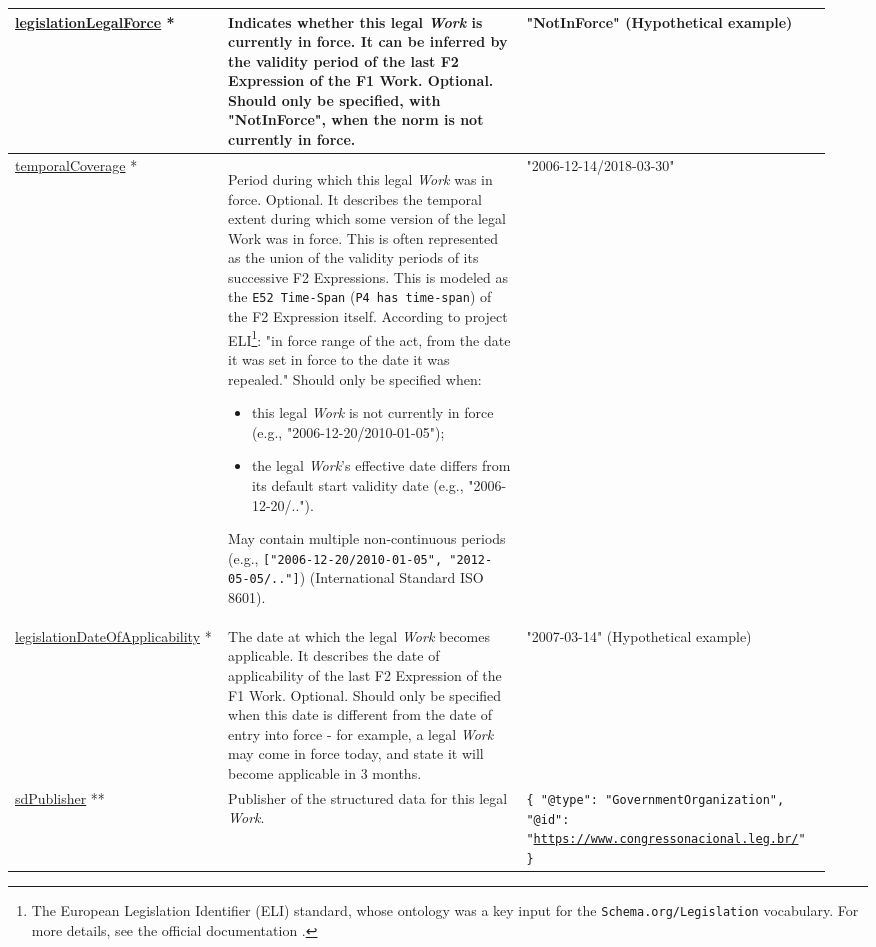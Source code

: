 \documentclass[11pt]{article}
\begin{document}
\begin{longtable}{p{0.25\linewidth} p{0.35\linewidth} p{0.35\linewidth}}
\url{legislationLegalForce} * & Indicates whether this legal \emph{Work} is currently in force.  It can be inferred by the validity period of the last F2 Expression of the F1 Work. Optional. \newline Should only be specified, with "NotInForce", when the norm is not currently in force. & "NotInForce" (Hypothetical example) \\
\midrule

\url{temporalCoverage} * & Period during which this legal \emph{Work} was in force. Optional. It describes the temporal extent during which some version of the legal Work was in force. This is often represented as the union of the validity periods of its successive F2 Expressions. This is modeled as the \texttt{E52 Time-Span} (\texttt{P4 has time-span}) of the F2 Expression itself. \newline 
According to project ELI\footnote{The European Legislation Identifier (ELI) standard, whose ontology was a key input for the \texttt{Schema.org/Legislation} vocabulary. For more details, see the official documentation \cite{eli-guide}.}: "in force range of the act, from the date it was set in force to the date it was repealed." \newline 
Should only be specified when: 
\begin{itemize}[noitemsep,topsep=0pt]
    \item this legal \emph{Work} is not currently in force (e.g., "2006-12-20/2010-01-05");
    \item the legal \emph{Work}'s effective date differs from its default start validity date (e.g., "2006-12-20/..").
\end{itemize}
May contain multiple non-continuous periods (e.g., \texttt{["2006-12-20/2010-01-05", "2012-05-05/.."]})  (International Standard ISO 8601). & "2006-12-14/2018-03-30" \\
\midrule

\url{legislationDateOfApplicability} * & The date at which the legal \emph{Work} becomes applicable. It describes the date of applicability of the last F2 Expression of the F1 Work. Optional. \newline Should only be specified when this date is different from the date of entry into force - for example, a legal \emph{Work} may come in force today, and state it will become applicable in 3 months. & "2007-03-14" (Hypothetical example) \\
\midrule

\url{sdPublisher} ** & Publisher of the structured data for this legal \emph{Work}. & \texttt{\{ "@type": "GovernmentOrganization", "@id": "\url{https://www.congressonacional.leg.br/}" \}} \\
\midrule


\end{longtable}
\end{document}
